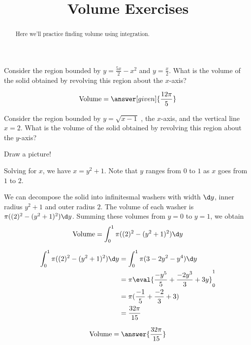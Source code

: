 \documentclass[handout]{ximera}
\title[Exercises:]{Volume Exercises}
\begin{document}
\begin{abstract}
  Here we'll practice finding volume using integration.
\end{abstract}
\maketitle

\begin{problem}
Consider the region bounded by $y = \frac{5x}{2}-x^2$ and
$y=\frac{x}{2}$.  What is the volume of the solid obtained by
revolving this region about the $x$-axis?

  \[
	\textrm{Volume} = \answer[given]{\frac{12 \pi}{5}}
	\]

\end{problem}

\begin{exercise}
Consider the region bounded by $y =\sqrt{x-1}$ , the $x$-axis, and the
vertical line $x=2$.  What is the volume of the solid obtained by
revolving this region about the $y$-axis?
\begin{hint}
  Draw a picture!
\end{hint}

\begin{hint}
  Solving for $x$, we have $x = y^2+1$.  Note that $y$ ranges from $0$ to $1$ as $x$ goes from $1$ to $2$.
\end{hint}

\begin{hint}
  We can decompose the solid into infinitesmal washers with width
  $\d y$, inner radius $y^2+1$ and outer radius $2$.  The volume of each
  washer is $\pi((2)^2 - (y^2+1)^2)\d y$.  Summing these volumes from
  $y=0$ to $y=1$, we obtain
  \[
  \textrm{Volume} = \int_0^1 \pi((2)^2 - (y^2+1)^2)\d y
  \]
\end{hint}

\begin{hint}
  \begin{align*}
    \int_0^1\pi((2)^2 - (y^2+1)^2)\d y &=  \int_0^1 \pi(3-2y^2-y^4)\d y\\
    &= \pi \eval{\frac{-y^5}{5}+\frac{-2y^3}{3}+3y}_0^1\\
    &=\pi(\frac{-1}{5}+\frac{-2}{3}+3)\\
    &=\frac{32\pi}{15}
  \end{align*}
\end{hint}

  \[
  \textrm{Volume} = \answer{\frac{32\pi}{15}}
  \]

\end{exercise}
\end{document}
